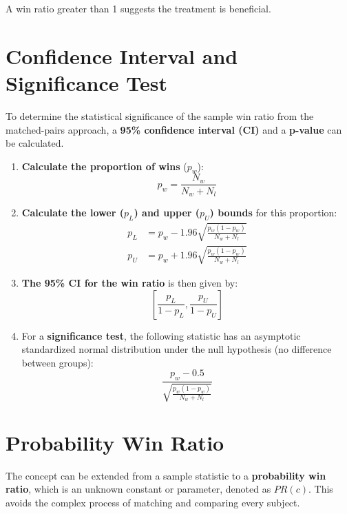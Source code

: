 \documentclass{article}
\begin{document}
A win ratio greater than 1 suggests the treatment is beneficial.

\section{Confidence Interval and Significance Test}

To determine the statistical significance of the sample win ratio from the matched-pairs approach, a \textbf{95\% confidence interval (CI)} and a \textbf{p-value} can be calculated.

\begin{enumerate}
    \item \textbf{Calculate the proportion of wins} ($p_w$):
    \begin{equation}
    p_w = \frac{N_w}{N_w + N_l}
    \end{equation}

    \item \textbf{Calculate the lower ($p_L$) and upper ($p_U$) bounds} for this proportion:
    \begin{align}
    p_L &= p_w - 1.96\sqrt{\frac{p_w(1-p_w)}{N_w + N_l}} \\
    p_U &= p_w + 1.96\sqrt{\frac{p_w(1-p_w)}{N_w + N_l}}
    \end{align}

    \item \textbf{The 95\% CI for the win ratio} is then given by:
    \begin{equation}
    \left[ \frac{p_L}{1-p_L}, \frac{p_U}{1-p_U} \right]
    \end{equation}

    \item For a \textbf{significance test}, the following statistic has an asymptotic standardized normal distribution under the null hypothesis (no difference between groups):
    \begin{equation}
    \frac{p_w - 0.5}{\sqrt{\frac{p_w(1-p_w)}{N_w+N_l}}}
    \end{equation}
\end{enumerate}

\section{Probability Win Ratio}

The concept can be extended from a sample statistic to a \textbf{probability win ratio}, which is an unknown constant or parameter, denoted as $PR(c)$. This avoids the complex process of matching and comparing every subject.
\end{document}
